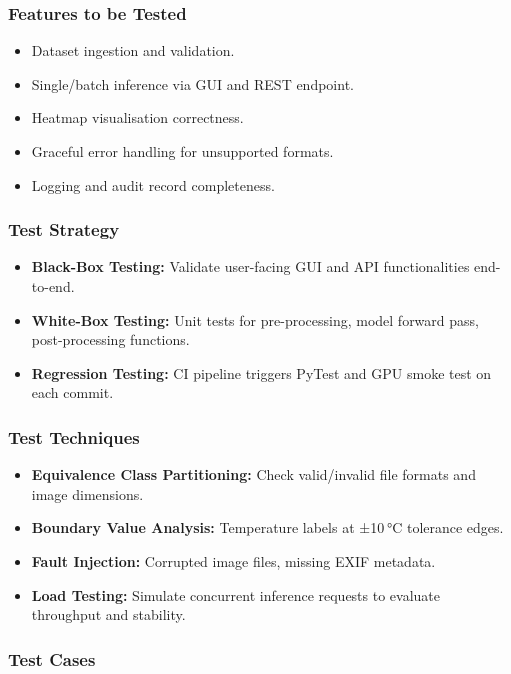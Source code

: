 \subsubsection{Features to be Tested}
\begin{itemize}
    \item Dataset ingestion and validation.
    \item Single/batch inference via GUI and REST endpoint.
    \item Heatmap visualisation correctness.
    \item Graceful error handling for unsupported formats.
    \item Logging and audit record completeness.
\end{itemize}

\subsubsection{Test Strategy}
\begin{itemize}
    \item \textbf{Black-Box Testing:} Validate user-facing GUI and API functionalities end-to-end.
    \item \textbf{White-Box Testing:} Unit tests for pre-processing, model forward pass, post-processing functions.
    \item \textbf{Regression Testing:} CI pipeline triggers PyTest and GPU smoke test on each commit.
\end{itemize}

\subsubsection{Test Techniques}
\begin{itemize}
    \item \textbf{Equivalence Class Partitioning:} Check valid/invalid file formats and image dimensions.
    \item \textbf{Boundary Value Analysis:} Temperature labels at ±10 °C tolerance edges.
    \item \textbf{Fault Injection:} Corrupted image files, missing EXIF metadata.
    \item \textbf{Load Testing:} Simulate concurrent inference requests to evaluate throughput and stability.
\end{itemize}

\subsubsection{Test Cases}

